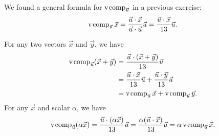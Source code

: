 \documentclass{workbook}
\begin{document}
\begin{slide}
\begin{parts}
\begin{enumerate}
\begin{solution}
						We found a general formula for $\operatorname{\operatorname{v\hspace{1pt}comp}}_{\vec u}$ in a previous
						exercise:
						\[
							\operatorname{\operatorname{v\hspace{1pt}comp}}_{\vec u}\vec x
							=\frac{\vec u\cdot\vec x}{\vec u\cdot\vec u}\vec u
							=\frac{\vec u\cdot\vec x}{13}\vec u.
						\]

						For any two vectors $\vec x$ and $\vec y$, we have
						\begin{align*}
							\operatorname{\operatorname{v\hspace{1pt}comp}}_{\vec u}(\vec x + \vec y)&=\frac{\vec u\cdot(\vec x + \vec y)}{13}\vec u\\
							&=\frac{\vec u\cdot\vec x}{13}\vec u + \frac{\vec u\cdot\vec y}{13}\vec u\\
							&=\operatorname{\operatorname{v\hspace{1pt}comp}}_{\vec u}\vec x + \operatorname{\operatorname{v\hspace{1pt}comp}}_{\vec u}\vec y.
						\end{align*}
						For any $\vec x$ and scalar $\alpha$, we have
						\[
							\operatorname{\operatorname{v\hspace{1pt}comp}}_{\vec u}(\alpha\vec x)
							=\frac{\vec u\cdot(\alpha\vec x)}{13}\vec u
							=\frac{\alpha(\vec u\cdot\vec x)}{13}\vec u
							=\alpha\operatorname{\operatorname{v\hspace{1pt}comp}}_{\vec u}\vec x.
						\]
					\end{solution}
			\end{enumerate}
	\end{parts}
\end{slide}
\end{document}
